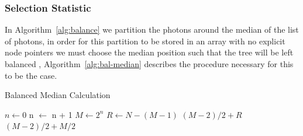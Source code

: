 \subsubsection{Selection Statistic}
In Algorithm~\ref{alg:balance} we partition the photons around the median of the list of photons, in order for
this partition to be stored in an array with no explicit node pointers we must choose the median position such
that the tree will be left balanced \cite{baerentzen03}, Algorithm~\ref{alg:bal-median} describes the procedure necessary for this
to be the case.

\begin{algorithm}
\caption{Balanced Median Calculation}
\label{alg:bal-median}
\begin{algorithmic}
\State $n \gets 0$
	\State n $\gets$ n + 1
\EndWhile
\State $M \gets 2^n$
\State $R \gets N - (M - 1)$
	\State \Return $(M - 2) / 2 + R$
\Else
	\State \Return $(M - 2) / 2 + M / 2$
\EndIf
\end{algorithmic}
\end{algorithm}
